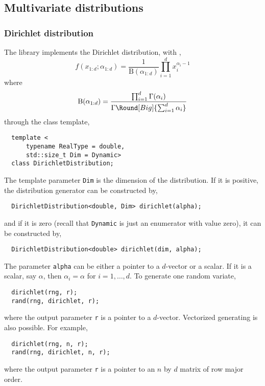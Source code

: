 \subsection{Multivariate distributions}
\label{sub:Multivariate distributions}

\subsubsection{Dirichlet distribution}

The library implements the Dirichlet distribution, with \pdf,
\begin{equation*}
  f(x_{1:d};\alpha_{1:d}) = \frac{1}{\mathrm{B}(\alpha_{1:d})}
  \prod_{i=1}^d x_i^{\alpha_i - 1}
\end{equation*}
where
\begin{equation*}
  \mathrm{B}(\alpha_{1:d}) =
  \frac{\prod_{i=1}^d\Gamma(\alpha_i)}
  {\Gamma\Round[Big]{\sum_{i=1}^d\alpha_i}}
\end{equation*}
through the class template,
\begin{Verbatim}
  template <
      typename RealType = double,
      std::size_t Dim = Dynamic>
  class DirichletDistribution;
\end{Verbatim}
The template parameter \verb|Dim| is the dimension of the distribution. If it
is positive, the distribution generator can be constructed by,
\begin{Verbatim}
  DirichletDistribution<double, Dim> dirichlet(alpha);
\end{Verbatim}
and if it is zero (recall that \verb|Dynamic| is just an enumerator with value
zero), it can be constructed by,
\begin{Verbatim}
  DirichletDistribution<double> dirichlet(dim, alpha);
\end{Verbatim}
The parameter \verb|alpha| can be either a pointer to a $d$-vector or a scalar.
If it is a scalar, say $\alpha$, then $\alpha_i = \alpha$ for $i = 1,\dots,d$.
To generate one random variate,
\begin{Verbatim}
  dirichlet(rng, r);
  rand(rng, dirichlet, r);
\end{Verbatim}
where the output parameter \verb|r| is a pointer to a $d$-vector. Vectorized
generating is also possible. For example,
\begin{Verbatim}
  dirichlet(rng, n, r);
  rand(rng, dirichlet, n, r);
\end{Verbatim}
where the output parameter \verb|r| is a pointer to an $n$ by $d$ matrix of row
major order.


